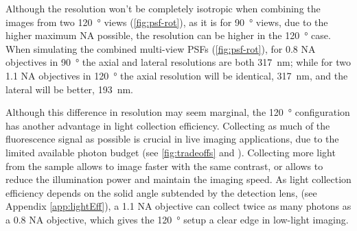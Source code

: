   Although the resolution won't be completely isotropic when combining the images from two \SI{120}{\degree} views (\autoref{fig:psf-rot}), as it is for \SI{90}{\degree} views, due to the higher maximum NA possible, the resolution can be higher in the \SI{120}{\degree} case. When simulating the combined multi-view PSFs (\autoref{fig:psf-rot}), for 0.8 NA objectives in \SI{90}{\degree} the axial and lateral resolutions are both \SI{317}{nm}; while for two 1.1 NA objectives in \SI{120}{\degree} the axial resolution will be identical, \SI{317}{nm}, and the lateral will be better, \SI{193}{nm}.
  
  Although this difference in resolution may seem marginal, the \SI{120}{\degree} configuration has another advantage in light collection efficiency. Collecting as much of the fluorescence signal as possible is crucial in live imaging applications, due to the limited available photon budget (see \autoref{fig:tradeoffs} and \cite{laissue_assessing_2017}). Collecting more light from the sample allows to image faster with the same contrast, or allows to reduce the illumination power and maintain the imaging speed. As light collection efficiency depends on the solid angle subtended by the detection lens, (see Appendix \autoref{app:lightEff}), a 1.1 NA objective can collect twice as many photons as a 0.8 NA objective, which gives the \SI{120}{\degree} setup a clear edge in low-light imaging.

